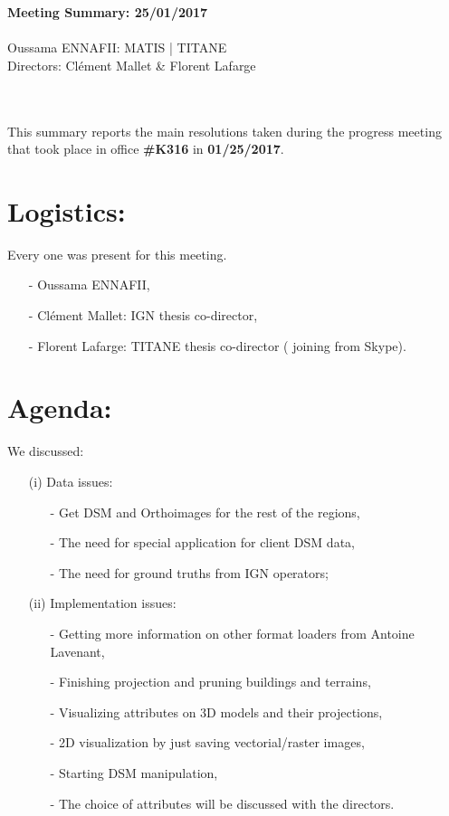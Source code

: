 \documentclass[a4paper, 11pt]{article}
\begin{document}
	\begin{centering}
		\large\textbf{Meeting Summary: 25/01/2017}\\
		~\\
		Oussama ENNAFII:
		\normalsize MATIS | TITANE \\
		Directors: Cl\'ement Mallet \& Florent Lafarge \\
	\end{centering}
	
	~\\~\\
	This summary reports the main resolutions taken during the progress meeting that took place in office \textbf{\#K316} in \textbf{01/25/2017}.
	\section*{Logistics:}
	Every one was present for this meeting.
	\begin{itemize}
		\item[-] Oussama ENNAFII,
		\item[-] Cl\'ement Mallet: IGN thesis co-director,
		\item[-] Florent Lafarge: TITANE thesis co-director ( joining from Skype).
	\end{itemize}
	
	\section*{Agenda:}
	
	We discussed: 
	\begin{itemize}
		\item[(i)] Data issues:
		\begin{itemize}
			\item[-] Get DSM and Orthoimages for the rest of the regions,
			\item[-] The need for special application for client DSM data,
			\item[-] The need for ground truths from IGN operators;
		\end{itemize}
		\item[(ii)] Implementation issues:
		\begin{itemize}
			\item[-] Getting more information on other format loaders from Antoine Lavenant,
			\item[-] Finishing projection and pruning buildings and terrains,
			\item[-] Visualizing attributes on 3D models and their projections,
			\item[-] 2D visualization by just saving vectorial/raster images,
			\item[-] Starting DSM manipulation,
			\item[-] The choice of attributes will be discussed with the directors.
		\end{itemize}
	\end{itemize}
	
\end{document}
